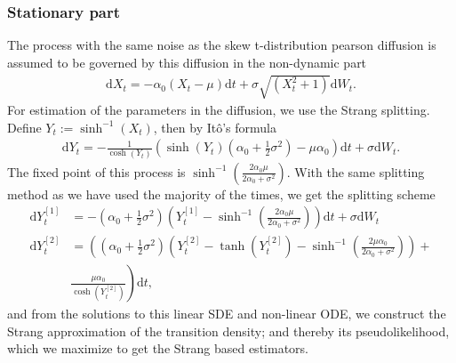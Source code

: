 \subsubsection{Stationary part}
The process with the same noise as the skew t-distribution pearson diffusion is assumed to be governed by this diffusion in the non-dynamic part
\begin{align}
    \mathrm{d}X_t = -\alpha_0\left(X_t - \mu\right)\mathrm{d}t + \sigma \sqrt{\left(X_t^2 + 1\right)}\mathrm{d}W_t.
\end{align}
For estimation of the parameters in the diffusion, we use the Strang splitting. Define $Y_t := \sinh^{-1}(X_t)$, then by Itô's formula
\begin{align}
    \mathrm{d}Y_t = - \frac{1}{\cosh(Y_t)}\left(\sinh(Y_t)\left(\alpha_0 + \frac{1}{2}\sigma^2\right) - \mu\alpha_0\right)\mathrm{d}t + \sigma \mathrm{d}W_t.
\end{align}
The fixed point of this process is $\sinh^{-1}(\frac{2\alpha_0\mu}{2\alpha_0 + \sigma^2})$. With the same splitting method as we have used the majority of the times, we get the splitting scheme
\begin{align}
    \mathrm{d}Y_t^{[1]} &= -\left(\alpha_0 + \frac{1}{2}\sigma^2\right)\left(Y_t^{[1]} - \sinh^{-1}\left(\frac{2\alpha_0\mu}{2\alpha_0 + \sigma^2}\right)\right)\mathrm{d}t + \sigma \mathrm{d}W_t \\
    \mathrm{d}Y_t^{[2]} &= \left(\left(\alpha_0 + \frac{1}{2}\sigma^2\right) \left(Y_t^{[2]} - \tanh\left(Y_t^{[2]}\right) - \sinh^{-1}\left(\frac{2\mu\alpha_0}{2\alpha_0 + \sigma^2}\right)\right) + \right. \nonumber \\
    &\left. \frac{\mu\alpha_0}{\cosh\left(Y_t^{[2]}\right)}\right)\mathrm{d}t,
\end{align}
and from the solutions to this linear SDE and non-linear ODE, we construct the Strang approximation of the transition density; and thereby its pseudolikelihood, which we maximize to get the Strang based estimators.
